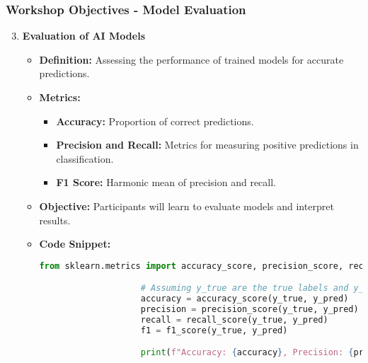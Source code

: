 \documentclass{beamer}
\begin{document}
\begin{frame}[fragile]
    \frametitle{Workshop Objectives - Model Evaluation}
    \begin{enumerate}
        \setcounter{enumi}{2}
        \item \textbf{Evaluation of AI Models}
            \begin{itemize}
                \item \textbf{Definition:} Assessing the performance of trained models for accurate predictions.
                \item \textbf{Metrics:}
                    \begin{itemize}
                        \item \textbf{Accuracy:} Proportion of correct predictions.
                        \item \textbf{Precision and Recall:} Metrics for measuring positive predictions in classification.
                        \item \textbf{F1 Score:} Harmonic mean of precision and recall.
                    \end{itemize}
                \item \textbf{Objective:} Participants will learn to evaluate models and interpret results.
                \item \textbf{Code Snippet:}
                    \begin{lstlisting}[language=Python]
                    from sklearn.metrics import accuracy_score, precision_score, recall_score, f1_score

                    # Assuming y_true are the true labels and y_pred are the predicted labels
                    accuracy = accuracy_score(y_true, y_pred)
                    precision = precision_score(y_true, y_pred)
                    recall = recall_score(y_true, y_pred)
                    f1 = f1_score(y_true, y_pred)

                    print(f"Accuracy: {accuracy}, Precision: {precision}, Recall: {recall}, F1 Score: {f1}")
                    \end{lstlisting}
            \end{itemize}
    \end{enumerate}
\end{frame}
\end{document}
